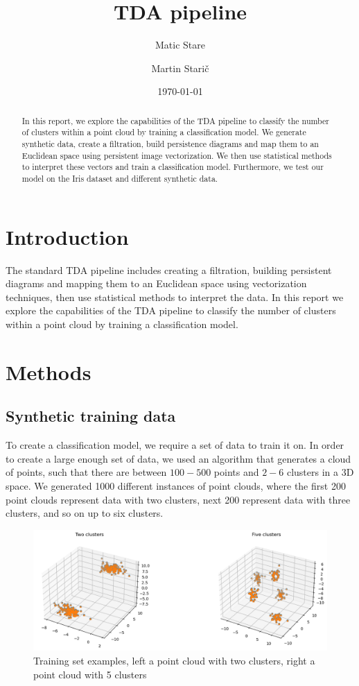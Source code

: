 \documentclass{article}
\title{TDA pipeline}
\author{
  Matic Stare
  \and
  Martin Starič
}
\date{\today}
\begin{document}
\maketitle

\tableofcontents
\newpage

\begin{abstract}
    In this report, we explore the capabilities of the TDA pipeline to classify the number of clusters within a point cloud by training a classification model. We generate synthetic data, create a filtration, build persistence diagrams and map them to an Euclidean space using persistent image vectorization. We then use statistical methods to interpret these vectors and train a classification model. Furthermore, we test our model on the Iris dataset and different synthetic data.
\end{abstract}

\section{Introduction}
The standard TDA pipeline includes creating a filtration, building persistent diagrams and mapping them to an Euclidean space using vectorization techniques, then use statistical methods to interpret the data. In this report we explore the capabilities of the TDA pipeline to classify the number of clusters within a point cloud by training a classification model.


\section{Methods}
\subsection{Synthetic training data}
To create a classification model, we require a set of data to train it on. In order to create a large enough set of data, we used an algorithm that generates a cloud of points, such that there are between $100-500$ points and $2-6$ clusters in a 3D space. We generated 1000 different instances of point clouds, where the first 200 point clouds represent data with two clusters, next 200 represent data with three clusters, and so on up to six clusters.

\begin{figure}[H]
    \centering
    \includegraphics[width=1\linewidth]{TrainingDataViz.png}
    \caption{Training set examples, left a point cloud with two clusters, right a point cloud with 5 clusters}
\end{figure}
\end{document}
